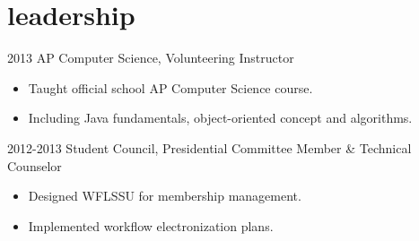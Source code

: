 \documentclass[]{friggeri-cv} %
\newenvironment{citemize}{\begin{itemize}[leftmargin=12pt]\vspace{-10pt}}{\end{itemize}}
\begin{document}

\section{leadership}

\begin{entrylist}
  \entry
  {2013}
  {AP Computer Science, Volunteering Instructor}
  {}
  {\begin{citemize}
    \item{Taught official school AP Computer Science course. }
    \item{Including Java fundamentals, object-oriented concept and algorithms. }
  \end{citemize}}
  \entry
  {2012-2013}
  {Student Council, Presidential Committee Member \& Technical Counselor}
  {}
  {\begin{citemize}
      \item{Designed WFLSSU for membership management. }
      \item{Implemented workflow electronization plans. }
    \end{citemize}}
\end{entrylist}
\end{document}
